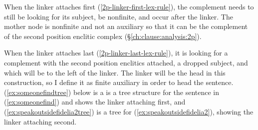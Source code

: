 When the linker attaches first (\ref{2p-linker-first-lex-rule}), the complement needs to still be looking for its subject, be nonfinite, and occur after the linker. The mother node is nonfinite and not an auxiliary so that it can be the complement of the second position enclitic complex (\S\ref{ch:clause:analysis:2p}).

When the linker attaches last (\ref{2p-linker-last-lex-rule}), it is looking for a complement with the second position enclitics attached, a dropped subject, and which will be to the left of the linker. The linker will be the head in this construction, so I define it as finite auxiliary in order to head the sentence. (\ref{ex:someonefindtree}) below is a is a tree structure for the sentence in (\ref{ex:someonefind}) and shows the linker attaching first, and (\ref{ex:speakoutsidefidelia2tree}) is a tree for (\ref{ex:speakoutsidefidelia2}), showing the linker attaching second.

